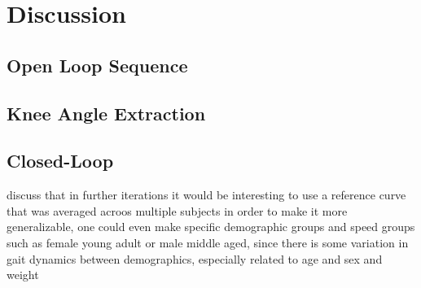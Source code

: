 
\section{Discussion}
\subsection{Open Loop Sequence}

\subsection{Knee Angle Extraction}

\subsection{Closed-Loop}


discuss that in further iterations it would be interesting to use a reference curve that was averaged acroos multiple subjects in order to make it more generalizable, one could even make specific demographic groups and speed groups such as female young adult or male middle aged, since there is some variation in gait dynamics between demographics, especially related to age and sex and weight


